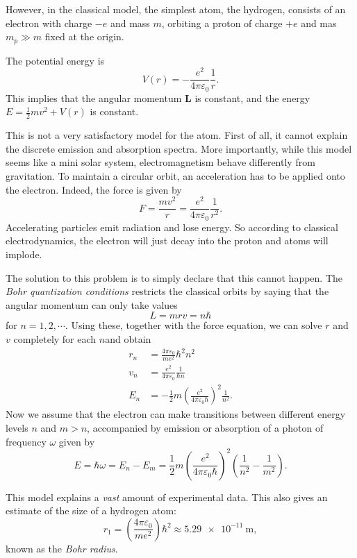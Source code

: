 \documentclass[a4paper]{article}
\begin{document}
However, in the classical model, the simplest atom, the hydrogen, consists of an electron with charge $-e$ and mass $m$, orbiting a proton of charge $+e$ and mas $m_p \gg m$ fixed at the origin.

The potential energy is
\[
  V(r) = -\frac{e^2}{4\pi\varepsilon_0}\frac{1}{r}.
\]
This implies that the angular momentum $\mathbf{L}$ is constant, and the energy $E = \frac{1}{2}mv^2 + V(r)$ is constant.

This is not a very satisfactory model for the atom. First of all, it cannot explain the discrete emission and absorption spectra. More importantly, while this model seems like a mini solar system, electromagnetism behave differently from gravitation. To maintain a circular orbit, an acceleration has to be applied onto the electron. Indeed, the force is given by
\[
  F = \frac{mv^2}{r} = \frac{e^2}{4\pi \varepsilon_0}\frac{1}{r^2}.
\]
Accelerating particles emit radiation and lose energy. So according to classical electrodynamics, the electron will just decay into the proton and atoms will implode.

The solution to this problem is to simply declare that this cannot happen. The \emph{Bohr quantization conditions} restricts the classical orbits by saying that the angular momentum can only take values
\[
  L = mrv = n\hbar
\]
for $n = 1, 2, \cdots$. Using these, together with the force equation, we can solve $r$ and $v$ completely for each $n$and obtain
\begin{align*}
  r_n &= \frac{4\pi \varepsilon_0}{me^2}\hbar^2 n^2\\
  v_n &= \frac{e^2}{4\pi \varepsilon_0}\frac{1}{\hbar n}\\
  E_n &= -\frac{1}{2}m\left(\frac{e^2}{4\pi \varepsilon_0 \hbar}\right)^2 \frac{1}{n^2}.
\end{align*}
Now we assume that the electron can make transitions between different energy levels $n$ and $m > n$, accompanied by emission or absorption of a photon of frequency $\omega$ given by
\[
  E = \hbar \omega = E_n - E_m = \frac{1}{2}m \left(\frac{e^2}{4\pi \varepsilon_0 \hbar}\right)^2\left(\frac{1}{n^2} - \frac{1}{m^2}\right).
\]
\begin{center}
\end{center}
This model explains a \emph{vast} amount of experimental data. This also gives an estimate of the size of a hydrogen atom:
\[
  r_1 = \left(\frac{4\pi \varepsilon_0}{me^2}\right) \hbar^2 \approx \SI{5.29e-11}{\meter},
\]
known as the \emph{Bohr radius}.
\end{document}
